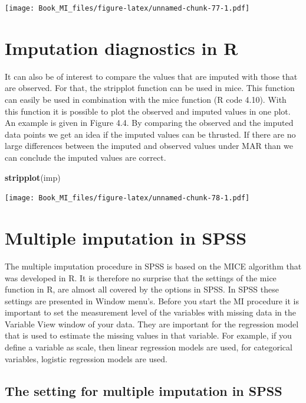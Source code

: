 \documentclass[]{book}
\newenvironment{Shaded}{\begin{snugshade}}{\end{snugshade}}
\newcommand{\KeywordTok}[1]{\textcolor[rgb]{0.13,0.29,0.53}{\textbf{#1}}}
\newcommand{\NormalTok}[1]{#1}
\theoremstyle{definition}
\theoremstyle{definition}
\theoremstyle{definition}
\theoremstyle{remark}
\begin{document}
\texttt{[image: Book\_MI\_files/figure-latex/unnamed-chunk-77-1.pdf]}

\section{Imputation diagnostics in R}\label{imputation-diagnostics-in-r}

It can also be of interest to compare the values that are imputed with
those that are observed. For that, the stripplot function can be used in
mice. This function can easily be used in combination with the mice
function (R code 4.10). With this function it is possible to plot the
observed and imputed values in one plot. An example is given in Figure
4.4. By comparing the observed and the imputed data points we get an
idea if the imputed values can be thrusted. If there are no large
differences between the imputed and observed values under MAR than we
can conclude the imputed values are correct.

\begin{Shaded}
\begin{Highlighting}[]
\KeywordTok{stripplot}\NormalTok{(imp)}
\end{Highlighting}
\end{Shaded}

\texttt{[image: Book\_MI\_files/figure-latex/unnamed-chunk-78-1.pdf]}

\section{Multiple imputation in SPSS}\label{multiple-imputation-in-spss}

The multiple imputation procedure in SPSS is based on the MICE algorithm
that was developed in R. It is therefore no surprise that the settings
of the mice function in R, are almost all covered by the options in
SPSS. In SPSS these settings are presented in Window menu's. Before you
start the MI procedure it is important to set the measurement level of
the variables with missing data in the Variable View window of your
data. They are important for the regression model that is used to
estimate the missing values in that variable. For example, if you define
a variable as scale, then linear regression models are used, for
categorical variables, logistic regression models are used.

\subsection{The setting for multiple imputation in
SPSS}\label{the-setting-for-multiple-imputation-in-spss}
\end{document}
